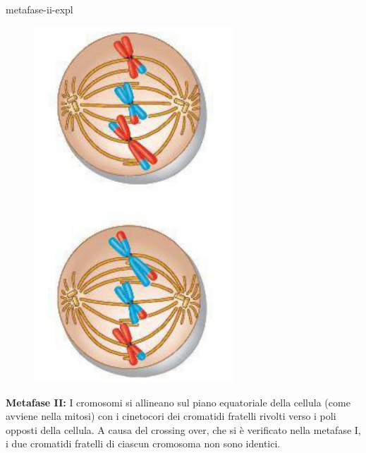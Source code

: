 \documentclass[preview]{standalone}
\begin{document}
\begin{snippet}{metafase-ii-expl}
    \setlength{\intextsep}{0pt}%
    \begin{figure}
        \includegraphics[width=7.5cm]{./resources/metafase-ii.png}
        \vspace{-1cm}
    \end{figure}

    \textbf{Metafase II:}
    I cromosomi si allineano sul piano equatoriale della cellula (come avviene nella mitosi) con
    i cinetocori dei cromatidi fratelli rivolti verso i poli opposti della cellula. A causa del crossing
    over, che si è verificato nella metafase I, i due cromatidi fratelli di ciascun cromosoma non
    sono identici.
    \wrapfill
\end{snippet}
\end{document}
